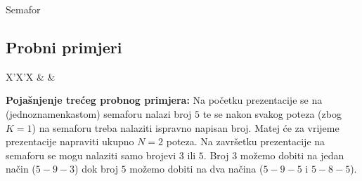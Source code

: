 \begin{statement}[
  problempoints=100,
  timelimit=5 sekundi,
  memorylimit=512 MiB,
]{Semafor}
\subsection*{Probni primjeri}
\begin{tabularx}{\textwidth}{X'X'X}
 &
 &
\end{tabularx}

\textbf{Pojašnjenje trećeg probnog primjera:}
Na početku prezentacije se na (jednoznamenkastom) semaforu nalazi broj $5$ te se
nakon svakog poteza (zbog $K = 1$) na semaforu treba nalaziti ispravno
napisan broj. Matej će za vrijeme prezentacije napraviti ukupno $N=2$ poteza.
Na završetku prezentacije na semaforu se mogu nalaziti samo brojevi $3$ ili
$5$.  Broj $3$ možemo dobiti na jedan način ($5-9-3$) dok broj $5$ možemo
dobiti na dva načina ($5-9-5$ i $5-8-5$).

\end{statement}

